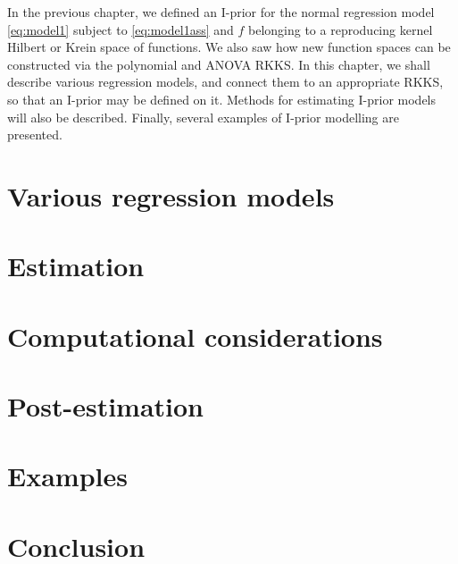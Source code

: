 \documentclass[a4paper,showframe,11pt]{report}
\begin{document}

In the previous chapter, we defined an I-prior for the normal regression model \eqref{eq:model1} subject to \eqref{eq:model1ass} and $f$ belonging to a reproducing kernel Hilbert or Krein space of functions.
We also saw how new function spaces can be constructed via the polynomial and ANOVA RKKS.
In this chapter, we shall describe various regression models, and connect them to an appropriate RKKS, so that an I-prior may be defined on it.
Methods for estimating I-prior models will also be described.
Finally, several examples of I-prior modelling are presented.

\section{Various regression models}\label{sec:various-regression}
%

\section{Estimation}


\section{Computational considerations}


\section{Post-estimation}
%

\section{Examples}
%

\section{Conclusion}
\end{document}
